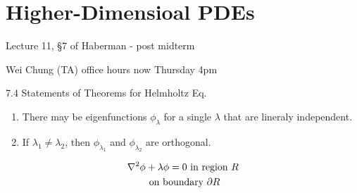 \section{Higher-Dimensioal PDEs}

Lecture 11, \S 7 of Haberman - post midterm

Wei Chung (TA) office hours now Thursday \@ 4pm

7.4 Statements of Theorems for Helmholtz Eq. 

\begin{enumerate}
  \item There may be eigenfunctions $\phi_\lambda$ for a single $\lambda$ that are lineraly independent.
  \item If $\lambda_1 \neq \lambda_2$, then $\phi_{\lambda_1}$ and $\phi_{\lambda_2}$ are orthogonal. 
\end{enumerate}
\begin{gather*}
  \laplacian \phi + \lambda \phi = 0 \text{ in region }R \\
  \text{ on boundary }\partial R \\
\end{gather*}

